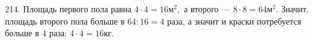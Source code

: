 214. Площадь первого пола равна $4\cdot4=16\text{м}^2,$ а второго --- $8\cdot8=64\text{м}^2.$ Значит, площадь второго пола больше в $64:16=4$ раза, а значит и краски потребуется больше в $4$ раза: $4\cdot4=16$кг.\\
